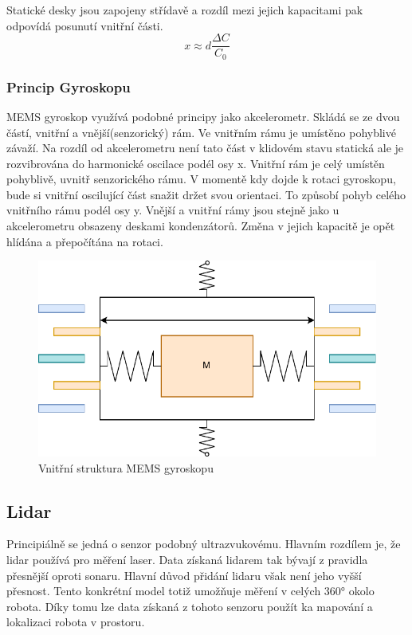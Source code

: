 Statické desky jsou zapojeny střídavě a rozdíl mezi jejich kapacitami pak odpovídá posunutí vnitřní části.
$$x \approx d \frac{\Delta C}{C_0}$$

\subsubsection{Princip Gyroskopu}
MEMS gyroskop využívá podobné principy jako akcelerometr. Skládá se ze dvou částí, vnitřní a vnější(senzorický) rám. Ve vnitřním rámu je umístěno pohyblivé závaží. Na rozdíl od akcelerometru není tato část v klidovém stavu statická ale je rozvibrována do harmonické oscilace podél osy x.
Vnitřní rám je celý umístěn pohyblivě, uvnitř senzorického rámu. V momentě kdy dojde k rotaci gyroskopu, bude si vnitřní oscilující část snažit držet svou orientaci. To způsobí pohyb celého vnitřního rámu podél osy y. Vnější a vnitřní rámy jsou stejně jako u akcelerometru obsazeny deskami kondenzátorů. Změna v jejich kapacitě je opět hlídána a přepočítána na rotaci.

\begin{figure}[h!]
	\centering
	\includegraphics[scale=0.8]{obrazky-figures/gyroscope.pdf}
	\caption{Vnitřní struktura MEMS gyroskopu}
	\label{}
\end{figure}

\subsection*{Lidar}
Principiálně se jedná o senzor podobný ultrazvukovému. Hlavním rozdílem je, že lidar používá pro měření laser. Data získaná lidarem tak bývají z pravidla přesnější oproti sonaru. Hlavní důvod přidání lidaru však není jeho vyšší přesnost. Tento konkrétní model totiž umožňuje měření v celých 360° okolo robota. Díky tomu lze data získaná z tohoto senzoru použít ka mapování a lokalizaci robota v prostoru.

